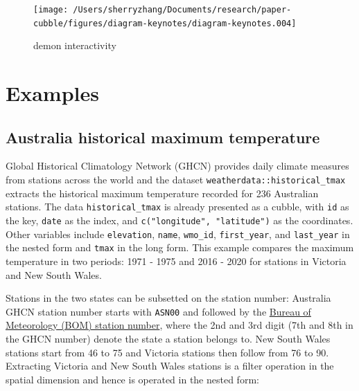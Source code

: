 \documentclass[
]{jss}
\begin{document}
\begin{CodeChunk}
\begin{figure}

{\centering \texttt{[image: /Users/sherryzhang/Documents/research/paper-cubble/figures/diagram-keynotes/diagram-keynotes.004]} 

}

\caption[demon interactivity]{demon interactivity}\label{fig:illu-interactive}
\end{figure}
\end{CodeChunk}

\newpage

\hypertarget{examples}{%
\section{Examples}\label{examples}}

\hypertarget{australia-historical-maximum-temperature}{%
\subsection{Australia historical maximum
temperature}\label{australia-historical-maximum-temperature}}

Global Historical Climatology Network (GHCN) provides daily climate
measures from stations across the world and the dataset
\texttt{weatherdata::historical\_tmax} extracts the historical maximum
temperature recorded for 236 Australian stations. The data
\texttt{historical\_tmax} is already presented as a cubble, with
\texttt{id} as the key, \texttt{date} as the index, and
\texttt{c("longitude",\ "latitude")} as the coordinates. Other variables
include \texttt{elevation}, \texttt{name}, \texttt{wmo\_id},
\texttt{first\_year}, and \texttt{last\_year} in the nested form and
\texttt{tmax} in the long form. This example compares the maximum
temperature in two periods: 1971 - 1975 and 2016 - 2020 for stations in
Victoria and New South Wales.

Stations in the two states can be subsetted on the station number:
Australia GHCN station number starts with \texttt{ASN00} and followed by
the \href{http://www.bom.gov.au/climate/cdo/about/site-num.shtml}{Bureau
of Meteorology (BOM) station number}, where the 2nd and 3rd digit (7th
and 8th in the GHCN number) denote the state a station belongs to. New
South Wales stations start from 46 to 75 and Victoria stations then
follow from 76 to 90. Extracting Victoria and New South Wales stations
is a filter operation in the spatial dimension and hence is operated in
the nested form:
\end{document}
